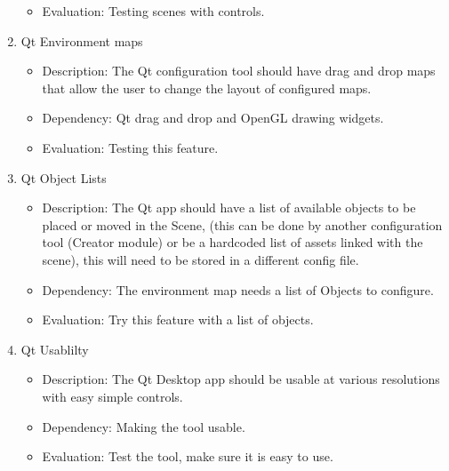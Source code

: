 \documentclass[a4paper,10pt]{article}
\begin{document}
\begin{enumerate}
\begin{itemize}
		 \item Evaluation:  Testing scenes with controls.
		\end{itemize}
		\item Qt Environment maps
		\begin{itemize}
		 \item Description: The Qt configuration tool should have drag and drop maps that allow the user to change the layout of configured maps.
		 \item Dependency:  Qt drag and drop and OpenGL drawing widgets. 
		 \item Evaluation:  Testing this feature.
		\end{itemize}
		\item Qt Object Lists
		\begin{itemize}
		 \item Description: The Qt app should have a list of available objects to be placed or moved in the Scene, (this can be done by another configuration tool 
		 (Creator module) or be a hardcoded list of assets linked with the scene), this will need to be stored in a different config file. 
		 \item Dependency:  The environment map needs a list of Objects to configure. 
		 \item Evaluation:  Try this feature with a list of objects.
		\end{itemize}

		\item Qt Usablilty
		\begin{itemize}
		 \item Description: The Qt Desktop app should be usable at various resolutions with easy simple controls. 
		 \item Dependency:  Making the tool usable.
		 \item Evaluation:  Test the tool, make sure it is easy to use.
		\end{itemize}
		

\end{enumerate}
\end{document}

